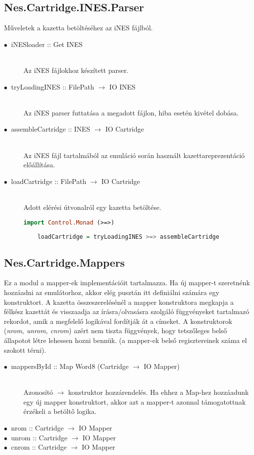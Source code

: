 \subsection{Nes.Cartridge.INES.Parser}

Műveletek a kazetta betöltéséhez az iNES fájlból.

\begin{description}
	\item[$\bullet\:$ iNESloader :: Get INES] \hfill \\
	Az iNES fájlokhoz készített parser.
	\item[$\bullet\:$ tryLoadingINES :: FilePath $\rightarrow$ IO INES] \hfill \\
	Az iNES parser futtatása a megadott fájlon, hiba esetén kivétel dobása.
	\item[$\bullet\:$ assembleCartridge :: INES $\rightarrow$ IO Cartridge] \hfill \\
	Az iNES fájl tartalmából az emuláció során használt kazettareprezentáció előállítása.
	\item[$\bullet\:$ loadCartridge :: FilePath $\rightarrow$ IO Cartridge] \hfill \\
	Adott elérési útvonalról egy kazetta betöltése.
	\begin{lstlisting}[language=Haskell]
	import Control.Monad (>=>)
	
	loadCartridge = tryLoadingINES >=> assembleCartridge
	\end{lstlisting}
\end{description}

\subsection{Nes.Cartridge.Mappers}

Ez a modul a mapper-ek implementációit tartalmazza. Ha új mapper-t szeretnénk hozzáadni az emulátorhoz, akkor elég pusztán itt definiálni számára egy konstruktort. A kazetta összeszerelésénél a mapper konstruktora megkapja a félkész kazettát és visszaadja az írásra/olvasásra szolgáló függvényeket tartalmazó rekordot, amik a megfelelő logikával fordítják át a címeket.
A konstruktorok (\emph{nrom, unrom, cnrom}) azért nem tiszta függvények, hogy tetszőleges belső állapotot létre lehessen hozni bennük. (a mapper-ek belső regisztereinek száma el szokott térni).

\begin{description}
	\item[$\bullet\:$ mappersById :: Map Word8 (Cartridge $\rightarrow$ IO Mapper)] \hfill \\
	Azonosító $\rightarrow$ konstruktor hozzárendelés. Ha ehhez a Map-hez hozzáadunk egy új mapper konstruktort, akkor azt a mapper-t azonnal támogatottnak érzékeli a betöltő logika.
	\item[$\bullet\:$ nrom  :: Cartridge $\rightarrow$ IO Mapper]
	\item[$\bullet\:$ unrom :: Cartridge $\rightarrow$ IO Mapper]
	\item[$\bullet\:$ cnrom :: Cartridge $\rightarrow$ IO Mapper]
\end{description}

